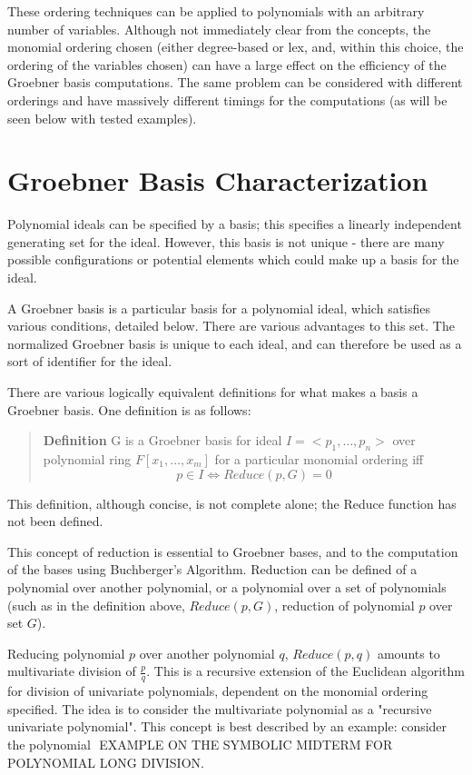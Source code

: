 \documentclass[letterpaper,12pt,titlepage,oneside,final]{book}
\newcounter{definitioncounter}
\newenvironment{defn}{\begin{quote}%
    \refstepcounter{definitioncounter}%
  \textbf{Definition \arabic{definitioncounter}}%
  \quad
}{%
\end{quote}%
}
\begin{document}
These ordering techniques can be applied to polynomials with an arbitrary number of variables.  Although not immediately clear from the concepts, the monomial ordering chosen (either degree-based or lex, and, within this choice, the ordering of the variables chosen) can have a large effect on the efficiency of the Groebner basis computations.  The same problem can be considered with different orderings and have massively different timings for the computations (as will be seen below with tested examples).


\section{Groebner Basis Characterization}

Polynomial ideals can be specified by a basis; this specifies a linearly independent generating set for the ideal.  However, this basis is not unique - there are many possible configurations or potential elements which could make up a basis for the ideal.  

A Groebner basis is a particular basis for a polynomial ideal, which satisfies various conditions, detailed below.  There are various advantages to this set.  The normalized Groebner basis is unique to each ideal, and can therefore be used as a sort of identifier for the ideal. 

There are various logically equivalent definitions for what makes a basis a Groebner basis.  One definition is as follows: 

\begin{defn}\label{Groebner Basis}
  G is a Groebner basis for ideal $I = <p_1, \ldots, p_n>$ over polynomial ring $F[x_1, \ldots, x_m]$ for a particular monomial ordering iff
  \begin{equation*}
    p \in I \iff Reduce( p, G) = 0
  \end{equation*}
\end{defn}

This definition, although concise, is not complete alone; the Reduce function has not been defined.

This concept of reduction is essential to Groebner bases, and to the computation of the bases using Buchberger's Algorithm.  Reduction can be defined of a polynomial over another polynomial, or a polynomial over a set of polynomials (such as in the definition above, ${Reduce( p, G)}$, reduction of polynomial ${p}$ over set ${G}$).  

Reducing polynomial ${p}$ over another polynomial ${q}$, ${Reduce( p, q)}$ amounts to multivariate division of ${\frac{p}{q}}$.  This is a recursive extension of the Euclidean algorithm for division of univariate polynomials, dependent on the monomial ordering specified.  The idea is to consider the multivariate polynomial as a "recursive univariate polynomial".  This concept is best described by an example: consider the polynomial ${}$ EXAMPLE ON THE SYMBOLIC MIDTERM FOR POLYNOMIAL LONG DIVISION.
\end{document}
